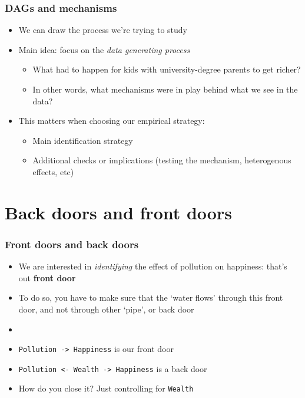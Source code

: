 \documentclass[aspectratio=43]{beamer}
\begin{document}
\begin{frame}
\frametitle{DAGs and mechanisms}
\centering

\begin{itemize}[<+->]
\item We can draw the process we're trying to study
\item Main idea: focus on the \textit{data generating process}
  \begin{itemize}
  \item What had to happen for kids with university-degree parents to get richer?
  \item In other words, what mechanisms were in play behind what we see in the data?
  \end{itemize}
\item This matters when choosing our empirical strategy:
  \begin{itemize}
  \item Main identification strategy
  \item Additional checks or implications (testing the mechanism, heterogenous effects, etc)
  \end{itemize}
\end{itemize}

\end{frame}

\section{Back doors and front doors}

\begin{frame}
\frametitle{Front doors and back doors}
\centering

\begin{itemize}
  \item<1-> We are interested in \textit{identifying} the effect of pollution on happiness: that's out \textbf{front door}
  \item<2-> To do so, you have to make sure that the `water flows' through this front door, and not through other `pipe', or back door
  \item[]
  \item<3-> \texttt{Pollution -> Happiness} is our front door
  \item<3-> \texttt{Pollution <- Wealth -> Happiness} is a back door
  \item<4-> How do you close it? Just controlling for \texttt{Wealth}
\end{itemize}

\end{frame}
\end{document}
